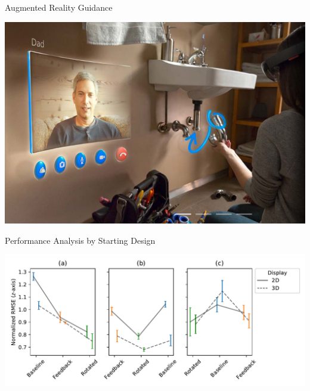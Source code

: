 \documentclass[10pt]{beamer}
\begin{document}
\begin{frame}[fragile]{Augmented Reality Guidance}
  \begin{center}
    \includegraphics[width=\textwidth]{../img/sink.png}
  \end{center}
\end{frame}

\begin{frame}[fragile]{Performance Analysis by Starting Design}
\begin{center}
  \includegraphics[width=\linewidth]{../img/x_design_y_zrmse_col_startdesign_hue_device.pdf}
\end{center}
\end{frame}
\end{document}
